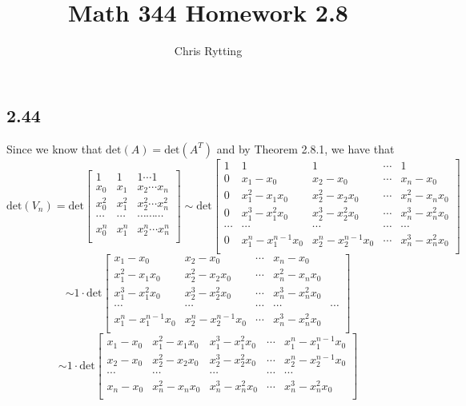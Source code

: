 \documentclass[letterpaper,12pt]{article}
\theoremstyle{definition}
\begin{document}
\title{Math 344 Homework 2.8}
\author{Chris Rytting}
\maketitle

\subsection*{2.44}
Since we know that $\text{det}(A) = \text{det}(A^T)$ and by Theorem 2.8.1, we have that
\[ \text{det}(V_n) = \text{det}
\begin{bmatrix}
    1 & 1 & 1 \cdots 1 \\ 
    x_0 & x_1 & x_2 \cdots x_n \\ 
    x_0^2 & x_1^2 & x_2^2 \cdots x_n^2 \\ 
    \cdots & \cdots & \cdots \cdots \cdots \\ 
    x_0^n & x_1^n & x_2^n \cdots x_n^n \\ 
\end{bmatrix} 
\sim
\text{det}
\begin{bmatrix}
    1 & 1 & 1 &\cdots& 1 \\ 
    0 & x_1 - x_0 & x_2 - x_0 &\cdots& x_n - x_0 \\ 
    0 & x_1^2 - x_1x_0 & x_2^2 - x_2x_0 &\cdots &x_n^2 - x_nx_0  \\ 
    0 & x_1^3 - x_1^2x_0 & x_2^3 - x_2^2x_0 &\cdots &x_n^3 - x_n^2x_0  \\ 
    \cdots & \cdots & \cdots& \cdots &\cdots \\ 
    0 & x_1^n - x_1^{n-1}x_0 & x_2^n - x_2^{n-1}x_0&\cdots& x_n^3 - x_n^2x_0  \\ 
\end{bmatrix} 
\]
\[ 
\sim
1\cdot\text{det}
\begin{bmatrix}
    x_1 - x_0 & x_2 - x_0 &\cdots& x_n - x_0 \\ 
    x_1^2 - x_1x_0 & x_2^2 - x_2x_0 &\cdots &x_n^2 - x_nx_0  \\ 
    x_1^3 - x_1^2x_0 & x_2^3 - x_2^2x_0 &\cdots &x_n^3 - x_n^2x_0  \\ 
    \cdots & \cdots & \cdots& \cdots &\cdots \\ 
    x_1^n - x_1^{n-1}x_0 & x_2^n - x_2^{n-1}x_0&\cdots& x_n^3 - x_n^2x_0  \\ 
\end{bmatrix}
\]
\[
\sim
1\cdot\text{det}
\begin{bmatrix}
    x_1 - x_0 & x_1^2 - x_1x_0 &x_1^3 - x_1^2x_0 &\cdots &x_1^n - x_1^{n-1}x_0\\
    x_2 - x_0 &x_2^2 - x_2x_0 &x_2^3 - x_2^2x_0 &\cdots & x_2^n - x_2^{n-1}x_0\\
    \cdots&\cdots&\cdots &\cdots &\cdots\\
    x_n - x_0 &x_n^2 - x_nx_0& x_n^3 - x_n^2x_0 &\cdots & x_n^3 - x_n^2x_0 \\ 
\end{bmatrix}
\]
\end{document}
